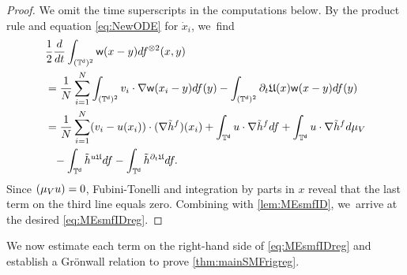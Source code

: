 \documentclass[JEP,XML,SOM,Unicode,published]{cedram}
\theoremstyle{plain}
\theoremstyle{definition}
\let\div\relax
\DeclareMathOperator{\div}{\mathrm{div}}
\newcommand{\T}{{\mathbb{T}}}
\let\nab\nabla
\let\p\partial
\let\tl\tilde
\newcommand{\ph}{\phantom{=}}
\newcommand{\Uu}{\mathfrak{U}}
\renewcommand{\d}{\mathsf{d}}
\newcommand{\w}{\mathsf{w}}
\begin{document}
\begin{proof}
We omit the time superscripts in the computations below.
By the product rule and equation \eqref{eq:NewODE} for $\dot{x}_i$, we~find
\begin{equation}
\label{eq:dtwff}
\begin{aligned}
&\frac12\frac{d}{dt}\int_{(\T^\d)^2}\w(x-y)df^{\otimes 2}(x,y)\\
&= \frac1N\sum_{i=1}^N\int_{(\T^\d)^2}v_i\cdot \nab\w(x_i-y)df(y) - \int_{(\T^\d)^2} \p_t\Uu(x) \w(x-y)df(y)\\
&=\frac1N\sum_{i=1}^N (v_i-u(x_i))\cdot (\nab\tl{h}^{f})(x_i) + \int_{\T^\d} u\cdot\nab\tl{h}^f df + \int_{\T^\d}u\cdot\nab\tl{h}^f d\mu_V\\
&\ph - \int_{\T^\d} \div \tl{h}^{u\Uu}df -\int_{\T^\d}\tl{h}^{\p_t\Uu} df . 
\end{aligned}
\end{equation}
Since $\div(\mu_V u) = 0$, Fubini-Tonelli and integration by parts in $x$ reveal that the last term on the third line equals zero. Combining with \cref{lem:MEsmfID}, we~arrive at the desired \eqref{eq:MEsmfIDreg}.
\end{proof}

We now estimate each term on the right-hand side of \eqref{eq:MEsmfIDreg} and establish a Grönwall relation to prove \cref{thm:mainSMFrigreg}.
\end{document}
